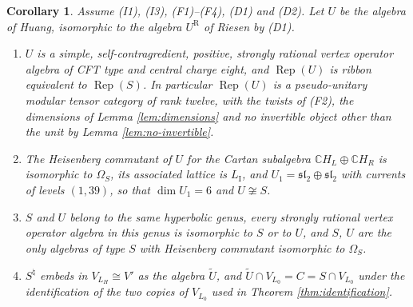 \documentclass[leqno]{article}
\newcommand{\Cbb}{\ensuremath{\mathbb{C}}}
\DeclareMathOperator{\Rep}{Rep}
\newtheorem{cor}[thm]{Corollary}
\numberwithin{equation}{section}
\begin{document}
\begin{cor}
\label{cor:twin-consequences}
Assume \textup{(I1)}, \textup{(I3)}, \textup{(F1)}--\textup{(F4)}, \textup{(D1)} and \textup{(D2)}. Let $U$ be the algebra of Huang, isomorphic to the algebra $U^{\mathrm R}$ of Riesen by \textup{(D1)}.
\begin{enumerate}
\item $U$ is a simple, self-contragredient, positive, strongly rational vertex operator algebra of CFT type and central charge eight, and $\Rep(U)$ is ribbon equivalent to $\Rep(S)$. In particular $\Rep(U)$ is a pseudo-unitary modular tensor category of rank twelve, with the twists of (F2), the dimensions of Lemma \ref{lem:dimensions} and no invertible object other than the unit by Lemma \ref{lem:no-invertible}.
\item The Heisenberg commutant of $U$ for the Cartan subalgebra $\Cbb H_L \oplus \Cbb H_R$ is isomorphic to $\Omega_S$, its associated lattice is $L_{\mathrm I}$, and $U_1 = \mathfrak{sl}_2 \oplus \mathfrak{sl}_2$ with currents of levels $(1,39)$, so that $\dim U_1 = 6$ and $U \not\cong S$.
\item $S$ and $U$ belong to the same hyperbolic genus, every strongly rational vertex operator algebra in this genus is isomorphic to $S$ or to $U$, and $S$, $U$ are the only algebras of type $S$ with Heisenberg commutant isomorphic to $\Omega_S$.
\item $S^\natural$ embeds in $V_{L_H} \cong V'$ as the algebra $\tilde U$, and $\tilde U \cap V_{L_0} = C = S \cap V_{L_0}$ under the identification of the two copies of $V_{L_0}$ used in Theorem \ref{thm:identification}.
\end{enumerate}
\end{cor}
\end{document}

